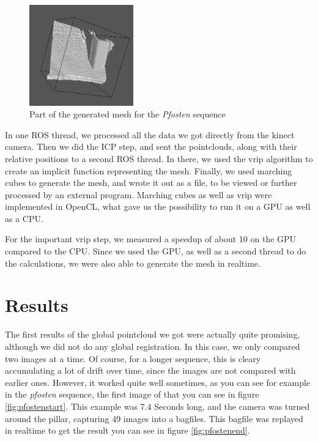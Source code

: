 \documentclass[10pt,twocolumn,letterpaper]{article}
\begin{document}
\begin{figure}
  \includegraphics[width=0.4\textwidth]{pfostenmesh}
  \caption{Part of the generated mesh for the \textit{Pfosten} sequence}
  \label{fig:pfostenmesh}
\end{figure}

In one ROS thread, we processed all the data we got directly from the kinect camera. Then we did the ICP step, and sent the pointclouds,
along with their relative positions to a second ROS thread. In there, we used the vrip algorithm \cite{vrip} to create an implicit
function representing the mesh. Finally, we used marching cubes to generate the mesh, and wrote it out as a file, to be viewed or further
processed by an external program. Marching cubes as well as vrip were implemented in OpenCL, what gave us the possibility to run it on a
GPU as well as a CPU.

For the important vrip step, we measured a speedup of about 10 on the GPU compared to the CPU.
Since we used the GPU, as well as a second thread to do the calculations, we were also able to generate the mesh in realtime.

\section{Results}
The first results of the global pointcloud we got were actually quite promising, although we did not do any global registration.
In this case, we only compared two images at a time. Of course, for a longer sequence, this is cleary accumulating a lot of
drift over time, since the images are not compared with earlier ones.
However, it worked quite well sometimes, as you can see for example in the \textit{pfosten} sequence, the first image of that you
can see in figure \ref{fig:pfostenstart}.
This example was 7.4 Seconds long, and the camera was turned around the pillar, capturing 49 images into a bagfiles.
This bagfile was replayed in realtime to get the result you can see in figure \ref{fig:pfostenend}.
\end{document}
